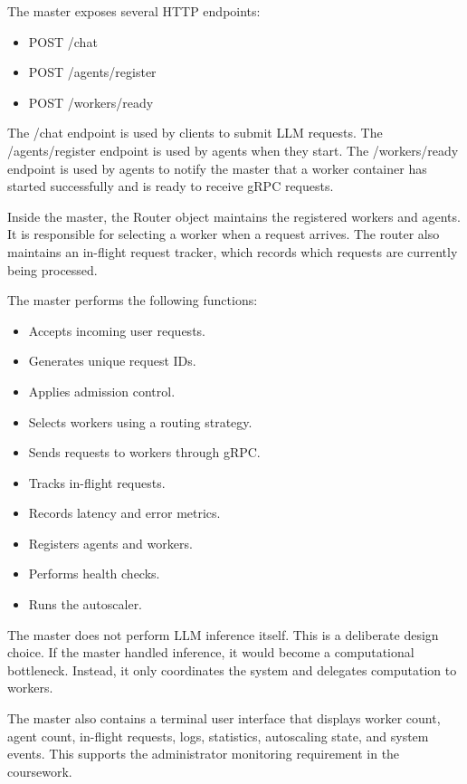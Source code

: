 The master exposes several HTTP endpoints:
\begin{itemize}[leftmargin=1.5em]
  \item POST /chat
  \item POST /agents/register
  \item POST /workers/ready
\end{itemize}

The /chat endpoint is used by clients to submit LLM requests. The /agents/register endpoint is used by agents when they start. The /workers/ready endpoint is used by agents to notify the master that a worker container has started successfully and is ready to receive gRPC requests.

Inside the master, the Router object maintains the registered workers and agents. It is responsible for selecting a worker when a request arrives. The router also maintains an in-flight request tracker, which records which requests are currently being processed.

The master performs the following functions:
\begin{itemize}[leftmargin=1.5em]
  \item Accepts incoming user requests.
  \item Generates unique request IDs.
  \item Applies admission control.
  \item Selects workers using a routing strategy.
  \item Sends requests to workers through gRPC.
  \item Tracks in-flight requests.
  \item Records latency and error metrics.
  \item Registers agents and workers.
  \item Performs health checks.
  \item Runs the autoscaler.
\end{itemize}

The master does not perform LLM inference itself. This is a deliberate design choice. If the master handled inference, it would become a computational bottleneck. Instead, it only coordinates the system and delegates computation to workers.

The master also contains a terminal user interface that displays worker count, agent count, in-flight requests, logs, statistics, autoscaling state, and system events. This supports the administrator monitoring requirement in the coursework.

